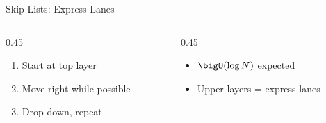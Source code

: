 \documentclass[aspectratio=169,10pt]{beamer}
\begin{document}
\begin{frame}{Skip Lists: Express Lanes}
\begin{tikzpicture}
\end{tikzpicture}

\bigskip
\begin{columns}[t]
\begin{column}{0.45\textwidth}
  \begin{enumerate}
    \item Start at top layer
    \item Move right while possible
    \item Drop down, repeat
  \end{enumerate}
\end{column}
\begin{column}{0.45\textwidth}
  \begin{itemize}
    \item $\bigO(\log N)$ expected
    \item Upper layers = express lanes
  \end{itemize}
\end{column}
\end{columns}

\end{frame}
\end{document}
